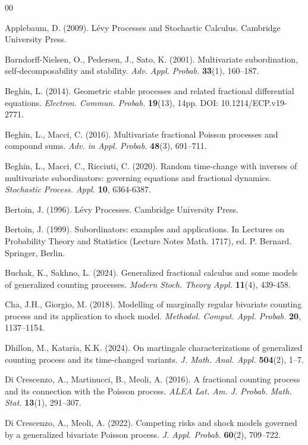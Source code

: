 \documentclass[12pt,oneside,reqno]{amsart}
\numberwithin{equation}{section}
\theoremstyle{definition}
\numberwithin{equation}{section}
\theoremstyle{remarkstyle}
\begin{document}
\begin{thebibliography}{00}	
	
Applebaum, D. (2009). L\'evy Processes and Stochastic Calculus. Cambridge University Press.

Barndorff-Nielsen, O., Pedersen, J., Sato, K. (2001). Multivariate subordination, self-decomposability and stability. {\it Adv. Appl. Probab.} {\bf 33}(1), 160–187.

Beghin, L. (2014). Geometric stable processes and related fractional differential equations. {\it Electron. Commun. Probab.} {\bf 19}(13), 14pp. DOI: 10.1214/ECP.v19-2771.

Beghin, L., Macci, C. (2016). Multivariate fractional Poisson processes and compound sums. {\it Adv. in
Appl. Probab.} {\bf 48}(3), 691–711.

Beghin, L., Macci, C., Ricciuti, C. (2020). Random time-change with inverses of multivariate
subordinators: governing equations and fractional dynamics. \textit{Stochastic Process. Appl.} \textbf{10}, 6364-6387. 

Bertoin, J. (1996). L\'evy Processes. Cambridge University Press.

Bertoin, J. (1999). Subordinators: examples and applications. In Lectures on Probability Theory and Statistics (Lecture
Notes Math. 1717), ed. P. Bernard. Springer, Berlin.


Buchak, K., Sakhno, L. (2024). Generalized fractional calculus and some models of generalized counting processes. {\it Modern Stoch. Theory Appl.} {\bf 11}(4), 439-458.


Cha, J.H., Giorgio, M. (2018). Modelling of marginally regular bivariate counting process and its application
to shock model. {\it Methodol. Comput. Appl. Probab.} {\bf 20}, 1137–1154.

Dhillon, M., Kataria, K.K. (2024). On martingale characterizations of generalized counting process and its time-changed variants. {\it J. Math. Anal. Appl.} {\bf 504}(2), 1–7.

Di Crescenzo, A., Martinucci, B., Meoli, A. (2016). A fractional counting process and its connection with the Poisson process. {\it ALEA Lat. Am. J. Probab. Math. Stat.} {\bf 13}(1), 291–307.

Di Crescenzo, A., Meoli, A. (2022). Competing risks and shock models governed by a generalized bivariate Poisson process. {\it J. Appl. Probab.} {\bf 60}(2), 709–722.
	

\end{thebibliography}
\end{document}
